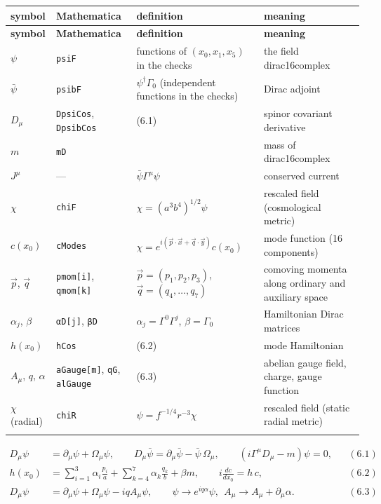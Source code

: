 \documentclass[10pt,a4paper]{article}
\begin{document}
{\small
\begin{longtable}{>{\raggedright\arraybackslash}p{}>{\raggedright\arraybackslash}p{}>{\raggedright\arraybackslash}p{}>{\raggedright\arraybackslash}p{}}
\toprule
\textbf{symbol} & \textbf{Mathematica} & \textbf{definition} & \textbf{meaning} \\
\midrule\endfirsthead
\toprule
\textbf{symbol} & \textbf{Mathematica} & \textbf{definition} & \textbf{meaning} \\
\midrule\endhead
\endfoot
\bottomrule\endlastfoot
$\psi$ & \texttt{psiF} & 16 functions of $(x_0,x_1,x_5)$ in the checks & the field dirac16complex \\
$\bar\psi$ & \texttt{psibF} & $\psi^\dagger\Gamma_0$ (independent functions in the checks) & Dirac adjoint \\
$D_\mu$ & \texttt{DpsiCos}, \texttt{DpsibCos} & (6.1) & spinor covariant derivative \\
$m$ & \texttt{mD} &  & mass of dirac16complex \\
$J^\mu$ & — & $\bar\psi\Gamma^\mu\psi$ & conserved current \\
$\chi$ & \texttt{chiF} & $\chi=(a^3b^4)^{1/2}\psi$ & rescaled field (cosmological metric) \\
$c(x_0)$ & \texttt{cModes} & $\chi=e^{i(\vec p\cdot\vec x+\vec q\cdot\vec y)}c(x_0)$ & mode function (16 components) \\
$\vec p$, $\vec q$ & \texttt{pmom[i]}, \texttt{qmom[k]} & $\vec p=(p_1,p_2,p_3)$, $\vec q=(q_4,\dots,q_7)$ & comoving momenta along ordinary and auxiliary space \\
$\alpha_j$, $\beta$ & \texttt{αD[j]}, \texttt{βD} & $\alpha_j=\Gamma^0\Gamma^j$, $\beta=\Gamma_0$ & Hamiltonian Dirac matrices \\
$h(x_0)$ & \texttt{hCos} & (6.2) & mode Hamiltonian \\
$A_\mu$, $q$, $\alpha$ & \texttt{aGauge[m]}, \texttt{qG}, \texttt{alGauge} & (6.3) & abelian gauge field, charge, gauge function \\
$\chi$ (radial) & \texttt{chiR} & $\psi=f^{-1/4}r^{-3}\chi$ & rescaled field (static radial metric) \\*
\end{longtable}}
\begin{align*}
D_\mu\psi&=\partial_\mu\psi+\Omega_\mu\psi,\qquad D_\mu\bar\psi=\partial_\mu\bar\psi-\bar\psi\,\Omega_\mu,\qquad (i\Gamma^\mu D_\mu-m)\psi=0,&&(6.1) \\
h(x_0)&=\sum_{i=1}^{3}\alpha_i\frac{p_i}{a}+\sum_{k=4}^{7}\alpha_k\frac{q_k}{b}+\beta m,\qquad i\frac{dc}{dx_0}=h\,c,&&(6.2) \\
D_\mu\psi&=\partial_\mu\psi+\Omega_\mu\psi-iqA_\mu\psi,\qquad \psi\to e^{iq\alpha}\psi,\ \ A_\mu\to A_\mu+\partial_\mu\alpha .&&(6.3)
\end{align*}
\end{document}
